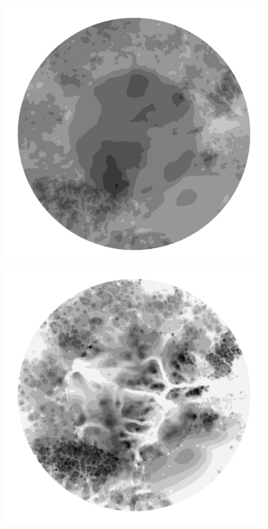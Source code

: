 \begin{figure}
  \begin{minipage}[b]{0.30\linewidth}
    \includegraphics[width=1.0\textwidth]{images/EISMINT_II/Ubar/S_2000.jpg}
  \end{minipage}
  \quad
  \begin{minipage}[b]{0.30\linewidth}
    \includegraphics[width=1.0\textwidth]{images/EISMINT_II/Ubar/beta_2000.jpg}

\end{minipage}
\end{figure}
